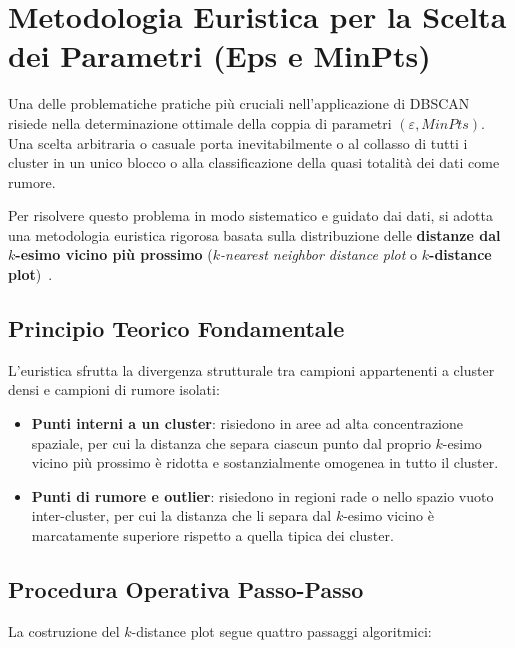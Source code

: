 \section{Metodologia Euristica per la Scelta dei Parametri (Eps e MinPts)}
\label{sec:dm-dbscan-parameter-selection}

Una delle problematiche pratiche più cruciali nell'applicazione di DBSCAN risiede nella determinazione ottimale della coppia di parametri $(\varepsilon, MinPts)$. Una scelta arbitraria o casuale porta inevitabilmente o al collasso di tutti i cluster in un unico blocco o alla classificazione della quasi totalità dei dati come rumore.

Per risolvere questo problema in modo sistematico e guidato dai dati, si adotta una metodologia euristica rigorosa basata sulla distribuzione delle \textbf{distanze dal $k$-esimo vicino più prossimo} (\textit{$k$-nearest neighbor distance plot} o \textbf{$k$-distance plot})~\cite{ester1996, tan2018}.

\subsection{Principio Teorico Fondamentale}

L'euristica sfrutta la divergenza strutturale tra campioni appartenenti a cluster densi e campioni di rumore isolati:
\begin{itemize}
    \item \textbf{Punti interni a un cluster}: risiedono in aree ad alta concentrazione spaziale, per cui la distanza che separa ciascun punto dal proprio $k$-esimo vicino più prossimo è ridotta e sostanzialmente omogenea in tutto il cluster.
    \item \textbf{Punti di rumore e outlier}: risiedono in regioni rade o nello spazio vuoto inter-cluster, per cui la distanza che li separa dal $k$-esimo vicino è marcatamente superiore rispetto a quella tipica dei cluster.
\end{itemize}

\subsection{Procedura Operativa Passo-Passo}

La costruzione del $k$-distance plot segue quattro passaggi algoritmici:

